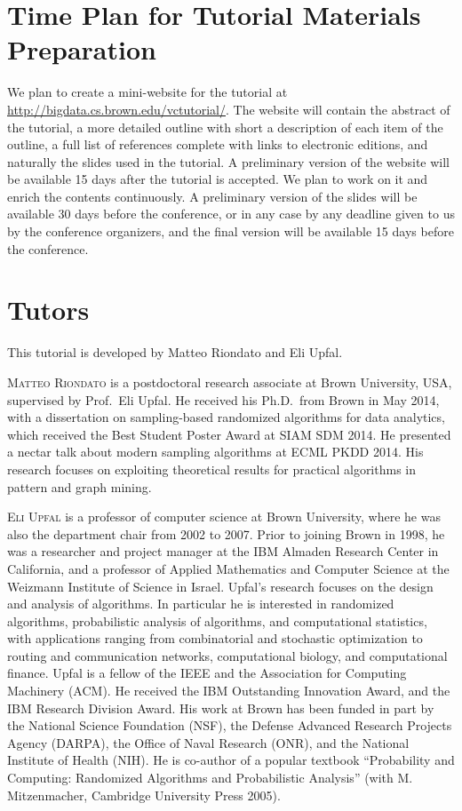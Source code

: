 \documentclass[11pt]{article}
\begin{document}
\section*{Time Plan for Tutorial Materials Preparation}
We plan to create a mini-website for the tutorial at
\url{http://bigdata.cs.brown.edu/vctutorial/}. The website will contain the
abstract of the tutorial, a more detailed outline with short a description of
each item of the outline, a full list of references complete with links to
electronic editions, and naturally the slides used in the tutorial. A
preliminary version of the website will be available 15 days after the tutorial
is accepted. We plan to work on it and enrich the contents continuously. A
preliminary version of the slides will be available 30 days before the
conference, or in any case by any deadline given to us by the conference
organizers, and the final version will be available 15 days before the
conference.

\section*{Tutors}
This tutorial is developed by Matteo Riondato and Eli Upfal.

\medskip
\noindent\textsc{Matteo Riondato} is a postdoctoral research associate at Brown
University, USA, supervised by Prof.~Eli Upfal. He received his Ph.D.~from Brown
in May 2014, with a dissertation on sampling-based randomized algorithms for
data analytics, which received the Best Student Poster Award at SIAM SDM 2014.
He presented a nectar talk about modern sampling algorithms at ECML PKDD 2014.
His research focuses on exploiting theoretical results for practical algorithms
in pattern and graph mining.

\medskip
\noindent\textsc{Eli Upfal} is a professor of computer science at Brown
University, where he was also the department chair from 2002 to 2007. Prior to
joining Brown in 1998, he was a researcher and project manager at the IBM
Almaden Research Center in California, and a professor of Applied Mathematics
and Computer Science at the Weizmann Institute of Science in Israel. Upfal's
research focuses on the design and analysis of algorithms. In particular he is
interested in randomized algorithms, probabilistic analysis of algorithms, and
computational statistics, with applications ranging from combinatorial and
stochastic optimization to routing and communication networks, computational
biology, and computational finance. Upfal is a fellow of the IEEE and the
Association for Computing Machinery (ACM). He received the IBM Outstanding
Innovation Award, and the IBM Research Division Award. His work at Brown has
been funded in part by the National Science Foundation (NSF), the Defense
Advanced Research Projects Agency (DARPA), the Office of Naval Research (ONR),
and the National Institute of Health (NIH). He is co-author of a popular
textbook ``Probability and Computing: Randomized Algorithms and Probabilistic
Analysis'' (with M. Mitzenmacher, Cambridge University Press 2005).
\end{document}

